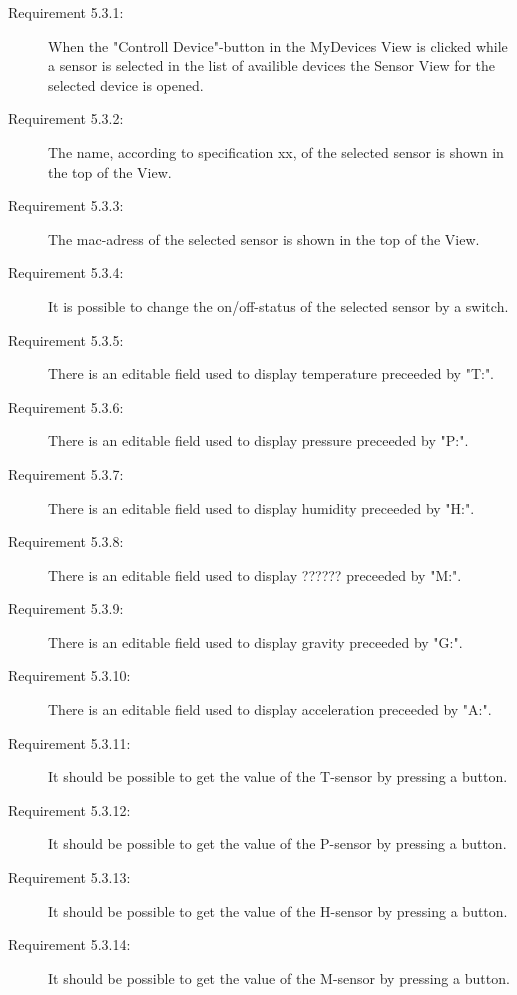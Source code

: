 \documentclass[a4paper]{article}
\begin{document}
\begin{description}
\item[Requirement 5.3.1:] When the "Controll Device"-button in the MyDevices View is clicked while a sensor is selected in the list of availible devices the Sensor View for the selected device is opened. 

\item[Requirement 5.3.2:] The name, according to specification xx, of the selected sensor is shown in the top of the View.

\item[Requirement 5.3.3:] The mac-adress of the selected sensor is shown in the top of the View.

\item[Requirement 5.3.4:] It is possible to change the on/off-status of the selected sensor by a switch.

\item[Requirement 5.3.5:] There is an editable field used to display temperature preceeded by "T:".

\item[Requirement 5.3.6:] There is an editable field used to display pressure preceeded by "P:".

\item[Requirement 5.3.7:] There is an editable field used to display humidity preceeded by "H:".

\item[Requirement 5.3.8:] There is an editable field used to display ?????? preceeded by "M:".

\item[Requirement 5.3.9:] There is an editable field used to display gravity preceeded by "G:".

\item[Requirement 5.3.10:] There is an editable field used to display acceleration preceeded by "A:".

\item[Requirement 5.3.11:] It should be possible to get the value of the T-sensor by pressing a button.

\item[Requirement 5.3.12:] It should be possible to get the value of the P-sensor by pressing a button.

\item[Requirement 5.3.13:] It should be possible to get the value of the H-sensor by pressing a button.

\item[Requirement 5.3.14:] It should be possible to get the value of the M-sensor by pressing a button.


\end{description}
\end{document}

